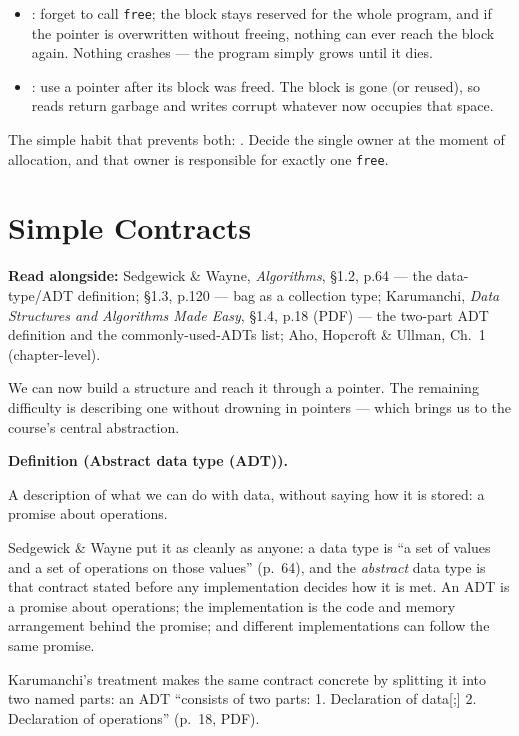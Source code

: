 \documentclass[11pt]{article}
\newenvironment{definitionbox}[1]{%
  \par\noindent\textbf{Definition (#1).}\ \itshape
}{\par\vspace{0.3em}}
\begin{document}
\begin{itemize}
  \item {}: forget to call \texttt{free}; the block stays
    reserved for the whole program, and if the pointer is overwritten without
    freeing, nothing can ever reach the block again. Nothing crashes --- the
    program simply grows until it dies.
  \item {}: use a pointer after its block was freed. The
    block is gone (or reused), so reads return garbage and writes corrupt
    whatever now occupies that space.
\end{itemize}

The simple habit that prevents both: . Decide the single owner at the moment of
allocation, and that owner is responsible for exactly one \texttt{free}.

\section{Simple Contracts}

\textbf{Read alongside:} Sedgewick \& Wayne, \textit{Algorithms}, \S1.2, p.64 --- the data-type/ADT definition; \S1.3, p.120 --- bag as a collection type; Karumanchi, \textit{Data Structures and Algorithms Made Easy}, \S1.4, p.18 (PDF) --- the two-part ADT definition and the commonly-used-ADTs list; Aho, Hopcroft \& Ullman, Ch.~1 (chapter-level).

We can now build a structure and reach it through a pointer. The remaining
difficulty is describing one without drowning in pointers --- which brings us to
the course's central abstraction.

\begin{definitionbox}{Abstract data type (ADT)}
A description of what we can do with data, without saying how it is stored: a
promise about operations.
\end{definitionbox}

Sedgewick \& Wayne put it as cleanly as anyone: a data type is ``a set of values
and a set of operations on those values'' \cite{Sedgewick2011_algorithms}
(p.~64), and the \emph{abstract} data type is that contract stated before any
implementation decides how it is met. An ADT is a promise about operations; the
implementation is the code and memory arrangement behind the promise; and
different implementations can follow the same promise.

Karumanchi's treatment makes the same contract concrete by splitting it into
two named parts: an ADT ``consists of two parts: 1. Declaration of data[;]
2. Declaration of operations'' \cite{Karumanchi2017_data_structures_algorithms_made_easy}
(p.~18, PDF). 
\end{document}
